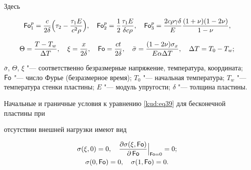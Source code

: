 Здесь

$$

\operatorname{\sf Fo}_1^p =\frac{c}{2\delta}\Bigl(  \tau_2 -\frac{ \tau_1 E}{ c^2 \rho } \Bigr),

\quad 

\operatorname{\sf Fo}_2^p = \frac12 \frac{ \tau_1 E}{\delta c\rho },

\quad 

\operatorname{\sf Fo}_3 ^p = \frac{2 c \rho \gamma \delta}E \frac{(1+ \nu )(1-2 \nu

)}{1- \nu },

$$ 


$$ \Theta=\frac{T-T_{w}}{\Delta T}, \quad 

\xi=\frac{x}{2\delta}, \quad 

\operatorname{\sf Fo}=\frac{ct}{2\delta }, \quad \bar  \sigma= \frac{( 1-2 \nu) \sigma_x }{E \alpha

\Delta T}, \quad 

\Delta T=T_0 -T_{w};$$ 

$\bar \sigma$, $ \Theta$, $ \xi $ "--- соответственно безразмерные напряжение, температура, координата; $\operatorname{\sf Fo}$ "--- число Фурье (безразмерное время); $T_0$ "--- начальная температура; $T_{w}$ "--- температура стенки пластины; $E$ "--- модуль упругости; $\delta$ "--- толщина пластины.



Начальные и граничные условия к уравнению \eqref{kud:eq39} для бесконечной пластины при

отсутствии внешней нагрузки имеют вид

\begin{gather}

\label{kud:eq41}

\sigma(\xi,0)=0,

\quad

\frac{\partial  \sigma( \xi, \operatorname{\sf Fo})}{\partial \operatorname{\sf Fo}}\Bigr|_{\operatorname{\sf Fo}=0}=0;\\

\label{kud:eq41a}

\sigma(0,\operatorname{\sf Fo})=0,

\quad

\sigma(1,\operatorname{\sf Fo})=0.

\end{gather}




